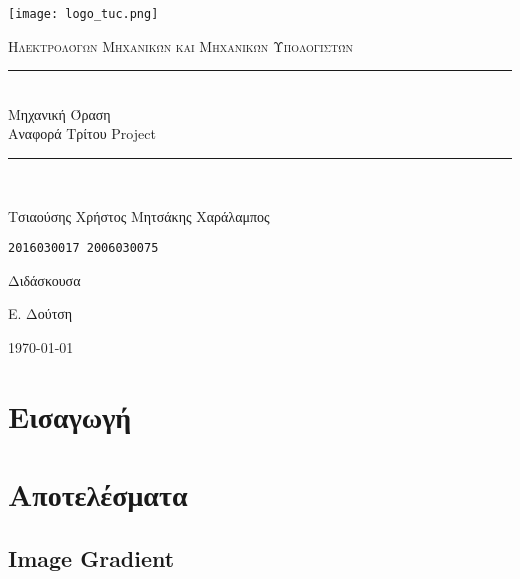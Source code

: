 \documentclass[11pt]{scrartcl} %
\begin{document}
\begin{titlepage}
    \centering
    \texttt{[image: logo\_tuc.png]}\par\vspace{1cm}
    \normalfont\normalsize
    \textsc{\textcolor[rgb]{0.66, 0.09, 0.19}{Ηλεκτρολόγων Μηχανικών και Μηχανικών Υπολογιστών}}\\ %
    \vspace{25pt} %
    \rule{\linewidth}{0.5pt}\\ %
    \vspace{20pt} %
    {\Huge Μηχανική Όραση}\\ %

    {\huge Αναφορά Τρίτου Project}\\ %
    \vspace{12pt} %
    \rule{\linewidth}{2pt}\\ %
    \vspace{12pt} %
    \vspace{2cm}

    {\LARGE{Τσιαούσης Χρήστος \hfill Μητσάκης Χαράλαμπος}
        \par
        \texttt{2016030017 \hfill 2006030075}
        \par
    }

    \vfill
    Διδάσκουσα

    Ε. Δούτση

    \vfill

    {\large \today\par}
\end{titlepage}

\newpage



\section{Εισαγωγή}

\section{Αποτελέσματα}

\subsection{Image Gradient}
\end{document}
